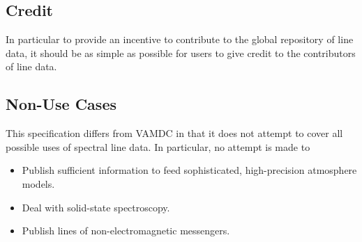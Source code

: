\documentclass[11pt,a4paper]{ivoa}
\begin{document}
\subsection{Credit}

In particular to provide an incentive to contribute to the global
repository of line data, it should be as simple as possible for users to
give credit to the contributors of line data.


\subsection{Non-Use Cases}

This specification differs from VAMDC in that it does not attempt to
cover all possible uses of spectral line data.  In particular, no
attempt is made to

\begin{itemize}
\item Publish sufficient information to feed sophisticated,
high-precision atmosphere models.
\item Deal with solid-state spectroscopy.
\item Publish lines of non-electromagnetic messengers.
\end{itemize}
\end{document}
